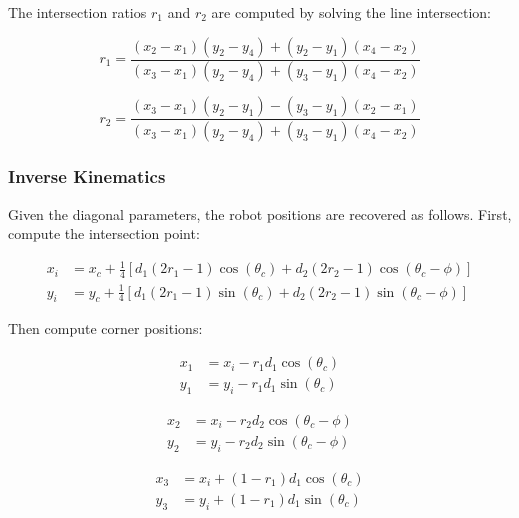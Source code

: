 \documentclass[lettersize,journal]{IEEEtran}
\begin{document}
The intersection ratios $r_1$ and $r_2$ are computed by solving the line intersection:

\begin{equation}
r_1 = \frac{(x_2 - x_1)(y_2 - y_4) + (y_2 - y_1)(x_4 - x_2)}{(x_3 - x_1)(y_2 - y_4) + (y_3 - y_1)(x_4 - x_2)}
\end{equation}

\begin{equation}
r_2 = \frac{(x_3 - x_1)(y_2 - y_1) - (y_3 - y_1)(x_2 - x_1)}{(x_3 - x_1)(y_2 - y_4) + (y_3 - y_1)(x_4 - x_2)}
\end{equation}

\subsubsection{Inverse Kinematics}

Given the diagonal parameters, the robot positions are recovered as follows. First, compute the intersection point:

\begin{equation}
\begin{aligned}
x_i &= x_c + \frac{1}{4}\left[d_1(2r_1 - 1)\cos(\theta_c) + d_2(2r_2 - 1)\cos(\theta_c - \phi)\right] \\
y_i &= y_c + \frac{1}{4}\left[d_1(2r_1 - 1)\sin(\theta_c) + d_2(2r_2 - 1)\sin(\theta_c - \phi)\right]
\end{aligned}
\end{equation}

Then compute corner positions:

\begin{equation}
\begin{aligned}
x_1 &= x_i - r_1 d_1 \cos(\theta_c) \\
y_1 &= y_i - r_1 d_1 \sin(\theta_c)
\end{aligned}
\end{equation}

\begin{equation}
\begin{aligned}
x_2 &= x_i - r_2 d_2 \cos(\theta_c - \phi) \\
y_2 &= y_i - r_2 d_2 \sin(\theta_c - \phi)
\end{aligned}
\end{equation}

\begin{equation}
\begin{aligned}
x_3 &= x_i + (1 - r_1) d_1 \cos(\theta_c) \\
y_3 &= y_i + (1 - r_1) d_1 \sin(\theta_c)
\end{aligned}
\end{equation}
\end{document}

